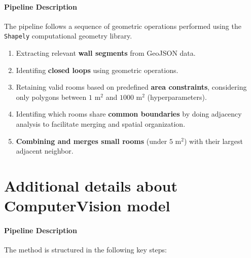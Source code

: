 \documentclass[11pt]{article}
\begin{document}
\paragraph{Pipeline Description} The pipeline follows a sequence of geometric operations performed using the 
\texttt{Shapely} computational geometry library.

\begin{enumerate}
    \item  Extracting relevant \textbf{wall segments} from GeoJSON data.
    \item Identifing \textbf{closed loops} using geometric operations.
    \item Retaining valid rooms based on predefined \textbf{area constraints}, 
    considering only polygons between $1 \text{ m}^2$ and $1000 \text{ m}^2$ (hyperparameters).
    \item Identifing which rooms share \textbf{common boundaries} by doing adjacency 
    analysis to facilitate merging and spatial organization.
    \item \textbf{Combining and merges small rooms} (under $5 \text{ m}^2$) with their 
    largest adjacent neighbor.
\end{enumerate}


\section{Additional details about ComputerVision model}
\label{app:sec:CVdetails}
\paragraph{Pipeline Description}
The method is structured in the following key steps:
\end{document}
